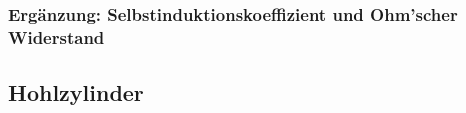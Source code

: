\begin{figure}[h!]
    \resizebox{\textwidth}{!}{}
\end{figure}
\begin{figure}[h!]
    \resizebox{\textwidth}{!}{}
\end{figure}


\subsubsection{Erg\"anzung: Selbstinduktionskoeffizient und Ohm'scher Widerstand}
\label{sec:ausw:subsec:vollz:subsubsec:LR}


\begin{figure}[h!]
    \resizebox{\textwidth}{!}{}
\end{figure}
\begin{figure}[h!]
    \resizebox{\textwidth}{!}{}
\end{figure}
\begin{figure}[h!]
    \resizebox{\textwidth}{!}{}
\end{figure}


\clearpage
\subsection{Hohlzylinder}
\label{sec:ausw:subsec:hohlz}


